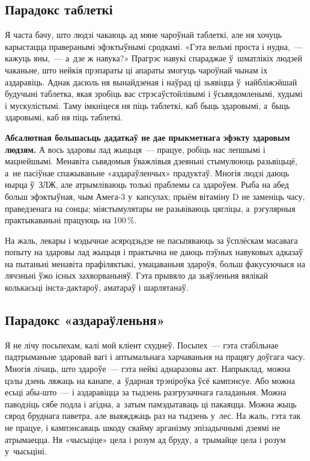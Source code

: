 \subsection*{Парадокс таблеткі}

Я часта бачу, што людзі чакаюць ад мяне чароўнай таблеткі, але ня хочуць карыстацца праверанымі эфэктыўнымі сродкамі. «Гэта вельмі проста і нудна,~--- кажуць яны,~--- а~дзе ж навука?» Прагрэс навукі спараджае ў~шматлікіх людзей чаканьне, што нейкія прэпараты ці апараты змогуць чароўнай чынам іх аздаравіць. Аднак дасюль ня вынайдзеная і наўрад ці зьявіцца ў~найбліжэйшай будучыні таблетка, якая зробіць вас стрэсаўстойлівымі і ўсьвядомленымі, худымі і мускулістымі. Таму імкніцеся ня піць таблеткі, каб быць здаровымі, а~быць здаровымі, каб ня піць таблеткі.

\textbf{Абсалютная большасьць дадаткаў не дае прыкметнага эфэкту здаровым людзям.} А вось здаровы лад жыцьця~--- працуе, робіць нас лепшымі і мацнейшымі. Менавіта сьвядомыя ўважлівыя дзеяньні стымулююць разьвіцьцё, а~не пасіўнае спажываньне «аздараўленчых» прадуктаў. Многія людзі даюць нырца ў~ЗЛЖ, але атрымліваюць толькі праблемы са здароўем. Рыба на абед больш эфэктыўная, чым Амега-3 у~капсулах; прыём вітаміну D не заменіць часу, праведзенага на сонцы; міястымулятары не разьвіваюць цягліцы, а~рэгулярныя практыкаваньні працуюць на 100\,\%.

На жаль, лекары і мэдычнае асяродзьдзе не пасьпяваюць за ўсплёскам масавага попыту на здаровы лад жыцьця і практычна не даюць пэўных навуковых адказаў на пытаньні менавіта прафіляктыкі, умацаваньня здароўя, больш факусуючыся на лячэньні ўжо існых захворваньняў. Гэта прывяло да зьяўленьня вялікай колькасьці інста-дактароў, аматараў і шарлятанаў.

\subsection*{Парадокс «аздараўленьня»} 

Я не лічу посьпехам, калі мой кліент схуднеў. Посьпех~--- гэта стабільнае падтрыманьне здаровай вагі і аптымальнага харчаваньня на працягу доўгага часу. Многія лічаць, што здароўе~--- гэта нейкі аднаразовы акт. Напрыклад, можна цэлы дзень ляжаць на канапе, а~ўдарная трэніроўка ўсё кампэнсуе. Або можна есьці абы-што~--- і аздаравіцца за тыдзень разгрузачнага галаданьня. Можна паводзіць сябе подла і агідна, а~затым памэдытаваць ці пакаяцца. Можна жыць сярод бруднага паветра, але выяжджаць раз на тыдзень у~лес. На жаль, гэта так не працуе, і кампэнсаваць шкоду свайму арганізму эпізадычнымі дзеямі не атрымаецца. Ня «чысьціце» цела і розум ад бруду, а~трымайце цела і розум у~чысьціні.

